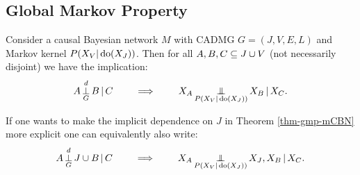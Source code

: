 \subsection{Global Markov Property}

\begin{Thm}
\label{thm-gmp-mCBN}
Consider a causal Bayesian network $M$  with \observational CADMG $G=(J,V,E,L)$ 
and \observational Markov kernel $P(X_V|\operatorname{do}(X_J))$.
Then for all $A, B, C \subseteq J \cup V$ (not necessarily disjoint) we have the implication:
\[ A \operatorname*{\perp}^d_G B \operatorname*{|} C \qquad \implies \qquad X_A \operatorname*{\perp\mkern-11mu\perp}_{P(X_V|\operatorname{do}(X_J))} X_B \operatorname*{|} X_C.   \]
\end{Thm}

\begin{Rem}
    If one wants to make the implicit dependence on $J$ in Theorem \ref{thm-gmp-mCBN} 
    more explicit one can equivalently also write:
\[ A \operatorname*{\perp}^d_G J \cup B \operatorname*{|} C \qquad \implies \qquad X_A \operatorname*{\perp\mkern-11mu\perp}_{P(X_V|\operatorname{do}(X_J))} X_J,X_{B} \operatorname*{|} X_C.   \]
\end{Rem}

